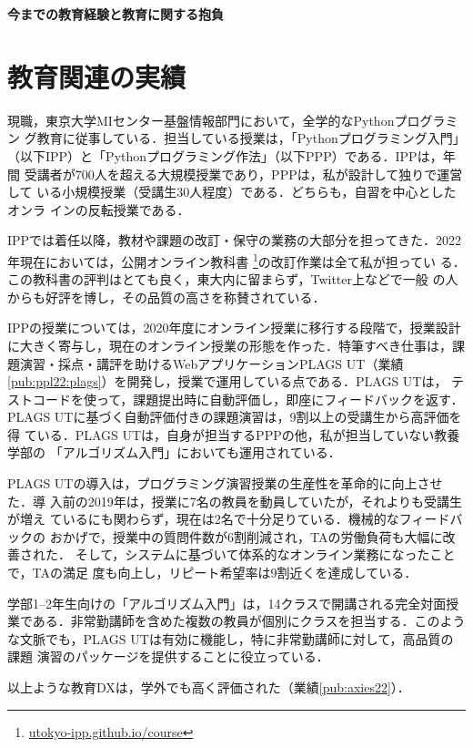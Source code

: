 \documentclass[dvipdfmx]{jsarticle}
\begin{document}
\newpage
\begin{center}
\LARGE\bfseries 今までの教育経験と教育に関する抱負
\end{center}
\bigskip

\section*{教育関連の実績}

現職，東京大学MIセンター基盤情報部門において，全学的なPythonプログラミン
グ教育に従事している．担当している授業は，「Pythonプログラミング入門」
（以下IPP）と「Pythonプログラミング作法」（以下PPP）である．IPPは，年間
受講者が700人を超える大規模授業であり，PPPは，私が設計して独りで運営して
いる小規模授業（受講生30人程度）である．どちらも，自習を中心としたオンラ
インの反転授業である．

IPPでは着任以降，教材や課題の改訂・保守の業務の大部分を担ってきた．2022
年現在においては，公開オンライン教科書
\footnote{\url{utokyo-ipp.github.io/course}}の改訂作業は全て私が担ってい
る．この教科書の評判はとても良く，東大内に留まらず，Twitter上などで一般
の人からも好評を博し，その品質の高さを称賛されている．

IPPの授業については，2020年度にオンライン授業に移行する段階で，授業設計
に大きく寄与し，現在のオンライン授業の形態を作った．特筆すべき仕事は，課
題演習・採点・講評を助けるWebアプリケーションPLAGS UT（業績
\ref{pub:ppl22:plags}）を開発し，授業で運用している点である．PLAGS UTは，
テストコードを使って，課題提出時に自動評価し，即座にフィードバックを返す．
PLAGS UTに基づく自動評価付きの課題演習は，9割以上の受講生から高評価を得
ている．PLAGS UTは，自身が担当するPPPの他，私が担当していない教養学部の
「アルゴリズム入門」においても運用されている．

PLAGS UTの導入は，プログラミング演習授業の生産性を革命的に向上させた．導
入前の2019年は，授業に7名の教員を動員していたが，それよりも受講生が増え
ているにも関わらず，現在は2名で十分足りている．機械的なフィードバックの
おかげで，授業中の質問件数が6割削減され，TAの労働負荷も大幅に改善された．
そして，システムに基づいて体系的なオンライン業務になったことで，TAの満足
度も向上し，リピート希望率は9割近くを達成している．

学部1--2年生向けの「アルゴリズム入門」は，14クラスで開講される完全対面授
業である．非常勤講師を含めた複数の教員が個別にクラスを担当する．このよう
な文脈でも，PLAGS UTは有効に機能し，特に非常勤講師に対して，高品質の課題
演習のパッケージを提供することに役立っている．

以上ような教育DXは，学外でも高く評価された（業績\ref{pub:axies22}）．
\end{document}
